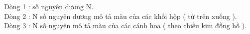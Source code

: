 Dòng 1 : số nguyên dương N.   
\\   Dòng 2 : N số nguyên dương mô tả màu của các khối hộp ( từ   trên xuống ).   
\\   Dòng 3 : N số nguyên mô tả màu của các cánh hoa ( theo chiều   kim đồng hồ ).
